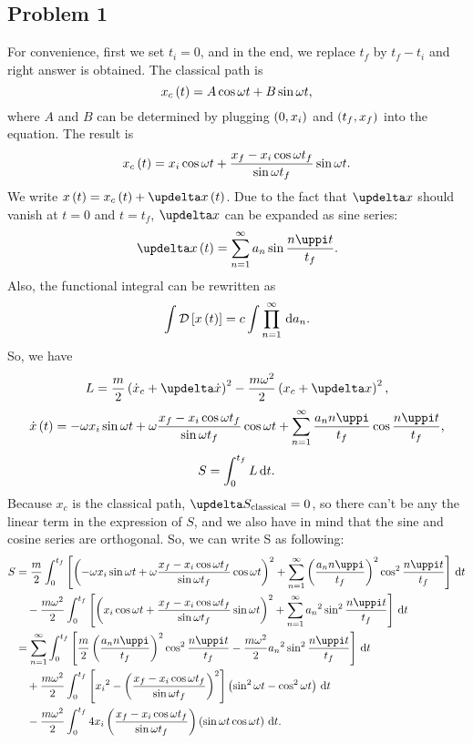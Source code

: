 \documentclass[11pt,fleqn]{article}
\newcommand{\dd}{\,\mathrm{d}}
\begin{document}
\subsection*{Problem 1}
For convenience, first we set $t_i=0$, and in the end, we replace $t_f$ by $t_f-t_i$ and right answer is obtained.
The classical path is \[x_c\left( t\right)=A \cos\omega t+B\sin \omega t\text{,}\]where $A$ and $B$ can be determined by plugging $\left(0,x_i\right)$ and $\left( t_f, x_f\right)$ into the equation. The result is
\[x_c\left( t\right)=x_i \cos\omega t+\frac{x_f-x_i\cos\omega t_f}{\sin\omega t_f}\sin \omega t\text{.}\]
We write $x\lb t\rb=x_c\lb t\rb+\deltaup x\bt$. Due to the fact that $\deltaup x$ should vanish at $t=0$ and $t=t_f$, $\deltaup x$ can be expanded as sine series: \[\deltaup x\bt=\sum_{n=1}^\infty a_n\sin\frac{n\piup t}{t_f}\ed\]
Also, the functional integral can be rewritten as \[\int\mathcal{D}\left[x\bt\right]=c\int\prod_{n=1}^\infty \dd a_n\ed\]
So, we have
\[L=\frac{m}{2}\lb\dot{x}_c+\deltaup\dot{x}\rb^2-\frac{m\omega^2}{2}\lb x_c+\deltaup x\rb^2\ec\]
\[\dot{x}\bt=-\omega x_i \sin\omega t +\omega \frac{x_f-x_i\cos\omega t_f}{\sin\omega t_f}\cos\omega t+\sum_{n=1}^\infty\frac{a_n n \piup}{t_f}\cos\frac{n \piup t}{t_f}\ec\]
\[S=\int_0^{t_f} L\,\mathrm{d} t\text{.}\]
Because $x_c$ is the classical path, $\deltaup S_\text{classical}=0$, so there can't be any the linear term in the expression of $S$, and we also have in mind that the sine and cosine series are orthogonal. So, we can write S as following:
\[\begin{split}S&{}=\frac{m}{2}\int_0^{t_f}\left[\lb-\omega x_i\sin\omega t+\omega \frac{x_f-x_i\cos\omega t_f}{\sin\omega t_f}\cos\omega t\rb^2+\sum_{n=1}^\infty\lb\frac{a_n n \piup}{t_f}\rb^2\cos^2\frac{n \piup t}{t_f}\right]\ndd t\\%
&\quad{}-\frac{m\omega^2}{2}\int_0^{t_f}\left[\lb x_i\cos\omega t+ \frac{x_f-x_i\cos\omega t_f}{\sin\omega t_f}\sin\omega t\rb^2+\sum_{n=1}^\infty {a_n}^2\sin^2\frac{n \piup t}{t_f}\right]\ndd t\\%
&{}=\sum_{n=1}^\infty\int_0^{t_f}\left[\frac{m}{2}\lb\frac{a_n n \piup}{t_f}\rb^2\cos^2\frac{n \piup t}{t_f}-\frac{m\omega^2}{2}{a_n}^2\sin^2\frac{n \piup t}{t_f}\right]\ndd t\\%
&\quad{}+\frac{m\omega^2}{2}\int_0^{t_f}\left[ {x_i}^2-\lb\frac{x_f-x_i\cos\omega t_f}{\sin\omega t_f}\rb^2\right]\lb\sin^2\omega t-\cos^2\omega t\rb\ndd t\\%
&\quad{}-\frac{m\omega^2}{2}\int_0^{t_f}4 {x_i}\lb\frac{x_f-x_i\cos\omega t_f}{\sin\omega t_f}\rb\lb\sin\omega t\cos\omega t\rb\ndd t\ed\end{split}\]
\end{document}
